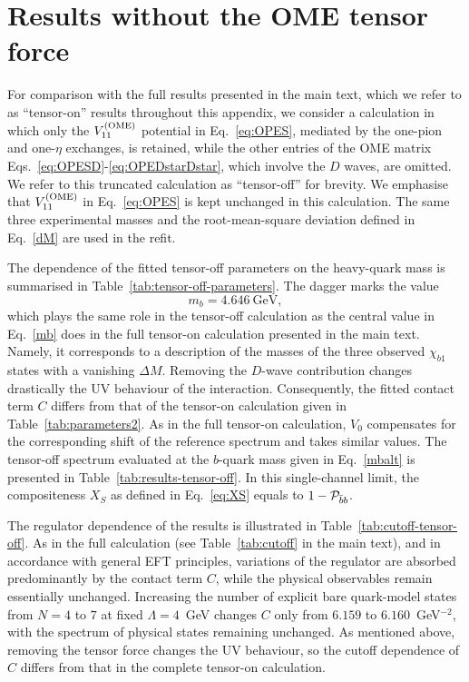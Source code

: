 \documentclass[aps,prd,showpacs,amsmath,twocolumn,superscriptaddress,floatfix,nofootinbib,notitlepage]{revtex4-2}
\newcommand{\be}{\begin{equation}}
\newcommand{\ee}{\end{equation}}
\begin{document}
\section{Results without the OME tensor force}
\label{app:tensor-off-reference}

For comparison with the full results presented in the main text, which we refer to as ``tensor-on'' results throughout this appendix, we consider a calculation in which only the $V_{11}^{\rm (OME)}$ potential in Eq.~\eqref{eq:OPES}, mediated by the one-pion and one-$\eta$ exchanges, is retained, while the other entries of the OME matrix Eqs.~\eqref{eq:OPESD}-\eqref{eq:OPEDstarDstar}, which involve the $D$ waves, are omitted. We refer to this truncated calculation as ``tensor-off'' for brevity. We emphasise that $V_{11}^{\rm (OME)}$ in Eq.~\eqref{eq:OPES} is kept unchanged in this calculation. The same three experimental masses and the root-mean-square deviation defined in Eq.~\eqref{dM} are used in the refit.

The dependence of the fitted tensor-off parameters on the heavy-quark mass is summarised in Table~\ref{tab:tensor-off-parameters}. The dagger marks the value
\be
m_b=4.646~\mbox{GeV},
\label{mbalt}
\ee
which plays the same role in the tensor-off calculation as the central value in Eq.~\eqref{mb} does in the full tensor-on calculation presented in the main text. Namely, it corresponds to a description of the masses of the three observed $\chi_{b1}$ states with a vanishing $\Delta M$. Removing the $D$-wave contribution changes drastically the UV behaviour of the interaction. Consequently, the fitted contact term $C$ differs from that of the tensor-on calculation given in Table~\ref{tab:parameters2}. As in the full tensor-on calculation, $V_0$ compensates for the corresponding shift of the reference spectrum and takes similar values. 
The tensor-off spectrum evaluated at the $b$-quark mass given in Eq.~\eqref{mbalt} is presented in Table~\ref{tab:results-tensor-off}. In this single-channel limit, the compositeness $X_S$ as defined in Eq.~\eqref{eq:XS} equals to $1-{\cal P}_{\bar{b}b}$.

The regulator dependence of the results is illustrated in Table~\ref{tab:cutoff-tensor-off}. As in the full calculation (see Table~\ref{tab:cutoff} in the main text), and in accordance with general EFT principles, variations of the regulator are absorbed predominantly by the contact term $C$, while the physical observables remain essentially unchanged. Increasing the number of explicit bare quark-model states from $N=4$ to $7$ at fixed $\Lambda=4$~GeV changes $C$ only from $6.159$ to $6.160$~GeV$^{-2}$, with the spectrum of physical states remaining unchanged.
As mentioned above, removing the tensor force changes the UV behaviour, so the cutoff dependence of $C$ differs from that in the complete tensor-on calculation.
\end{document}
